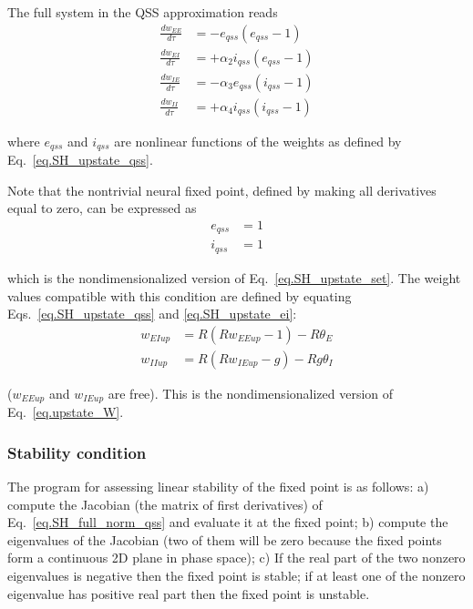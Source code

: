 \documentclass[twocolumn]{article}
\newcommand{\EE}{\mathit{EE}}
\newcommand{\EI}{\mathit{EI}}
\newcommand{\IE}{\mathit{IE}}
\newcommand{\II}{\mathit{II}}
\newcommand{\up}{\mathit{up}}
\newcommand{\qss}{\mathit{qss}}
\begin{document}
The full system in the QSS approximation reads
\begin{equation}
\begin{aligned}
\frac{dw_{\EE}}{d\tau} & = -e_{\qss}(e_{\qss}-1) \\
\frac{dw_{\EI}}{d\tau} & = +\alpha_2 i_{\qss}(e_{\qss}-1) \\
\frac{dw_{\IE}}{d\tau} & = -\alpha_3 e_{\qss}(i_{\qss}-1) \\
\frac{dw_{\II}}{d\tau} & = +\alpha_4 i_{\qss}(i_{\qss}-1)
\end{aligned}
\label{eq.SH_full_norm_qss}
\end{equation}

\noindent where $e_{\qss}$ and $i_{\qss}$ are nonlinear functions of the weights as defined by Eq.\ \ref{eq.SH_upstate_qss}.

Note that the nontrivial neural fixed point, defined by making all derivatives equal to zero, can be expressed as
\begin{equation}
\begin{aligned}
e_{\qss} & = 1 \\
i_{\qss} & = 1
\end{aligned}
\label{eq.SH_upstate_ei}
\end{equation}

\noindent which is the nondimensionalized version of Eq.\ \ref{eq.SH_upstate_set}. The weight values compatible with this condition are defined by equating Eqs.\ \ref{eq.SH_upstate_qss} and \ref{eq.SH_upstate_ei}:
\begin{equation}
\begin{aligned}
w_{\EI\up} & = R (Rw_{\EE\up} - 1) - R \theta_E \\
w_{\II\up} & = R (Rw_{\IE\up} - g) - Rg \theta_I
\end{aligned}
\label{eq.SH_upstate_w}
\end{equation}

\noindent ($w_{\EE\up}$ and $w_{\IE\up}$ are free). This is the nondimensionalized version of Eq.\ \ref{eq.upstate_W}.


\subsubsection{Stability condition}

The program for assessing linear stability of the fixed point is as follows: a) compute the Jacobian (the matrix of first derivatives) of Eq.\ \ref{eq.SH_full_norm_qss} and evaluate it at the fixed point; b) compute the eigenvalues of the Jacobian (two of them will be zero because the fixed points form a continuous 2D plane in phase space); c) If the real part of the two nonzero eigenvalues is negative then the fixed point is stable; if at least one of the nonzero eigenvalue has positive real part then the fixed point is unstable.
\end{document}
